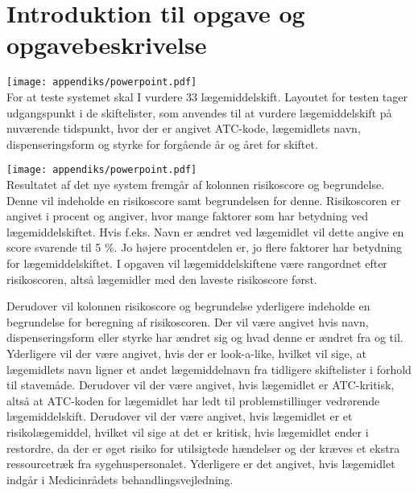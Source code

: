 \section{Introduktion til opgave og opgavebeskrivelse} \label{App:Intro_OPG}
\vspace{-0.3cm}
\texttt{[image: appendiks/powerpoint.pdf]} \\
For at teste systemet skal I vurdere 33 lægemiddelskift. Layoutet for testen tager udgangspunkt i de skiftelister, som anvendes til at vurdere lægemiddelskift på nuværende tidspunkt, hvor der er angivet ATC-kode, lægemidlets navn, dispenseringsform og styrke for forgående år og året for skiftet.

\texttt{[image: appendiks/powerpoint.pdf]} \\
Resultatet af det nye system fremgår af kolonnen risikoscore og begrundelse. Denne vil indeholde en risikoscore samt begrundelsen for denne. Risikoscoren er angivet i procent og angiver, hvor mange faktorer som har betydning ved lægemiddelskiftet. Hvis f.eks. Navn er ændret ved lægemidlet vil dette angive en score svarende til 5 \%. Jo højere procentdelen er, jo flere faktorer har betydning for lægemiddelskiftet. I opgaven vil lægemiddelskiftene være rangordnet efter risikoscoren, altså lægemidler med den laveste risikoscore først.   

Derudover vil kolonnen risikoscore og begrundelse yderligere indeholde en begrundelse for beregning af risikoscoren. Der vil være angivet hvis navn, dispenseringsform eller styrke har ændret sig og hvad denne er ændret fra og til. Yderligere vil der være angivet, hvis der er look-a-like, hvilket vil sige, at lægemidlets navn ligner et andet lægemiddelnavn fra tidligere skiftelister i forhold til stavemåde. Derudover vil der være angivet, hvis lægemidlet er ATC-kritisk, altså at ATC-koden for lægemidlet har ledt til problemstillinger vedrørende lægemiddelskift. Derudover vil der være angivet, hvis lægemidlet er et risikolægemiddel, hvilket vil sige at det er kritisk, hvis lægemidlet ender i restordre, da der er øget risiko for utilsigtede hændelser og der kræves et ekstra ressourcetræk fra sygehuspersonalet. Yderligere er det angivet, hvis lægemidlet indgår i Medicinrådets behandlingsvejledning. 

